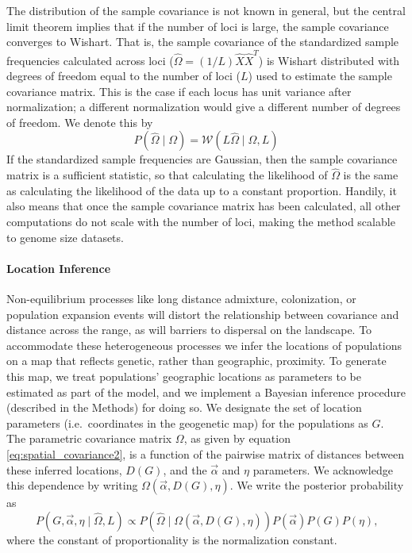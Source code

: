 \documentclass[12pt]{article}
\begin{document}
The distribution of the sample covariance is not known in general,
but the central limit theorem implies that if the number of loci is large, the sample covariance converges to Wishart.
That is, the sample covariance of the standardized sample frequencies calculated across loci 
($ \widehat{\Omega} = (1/L)  \hat{X}\hat{X}^T$) 
is Wishart distributed with degrees of freedom equal to the number of loci ($L$) used to estimate the sample covariance matrix. 
This is the case if each locus has unit variance after normalization; a different normalization would give a different number of degrees of freedom.
We denote this by
\begin{equation}
\label{eq:wishart_dist}
P(\widehat{\Omega} \mid \Omega) = \mathcal{W}\left( L\widehat{\Omega} \mid \Omega,L \right)
\end{equation}
If the standardized sample frequencies are Gaussian, then the sample covariance matrix is a sufficient statistic,
so that calculating the likelihood of $\widehat \Omega$ is the same as calculating the likelihood of the data up to a constant proportion.
Handily, it also means that once the sample covariance matrix has been calculated, all other computations do not scale with the number of loci, making the method scalable to genome size datasets. 

\paragraph{Location Inference} Non-equilibrium processes like long distance admixture, colonization, or population expansion events will distort the relationship between covariance and distance across the range, as will barriers to dispersal on the landscape. To accommodate these heterogeneous processes we infer the locations of populations on a map that reflects genetic, rather than geographic, proximity.  To generate this map, we treat populations' geographic locations as parameters to be estimated as part of the model, and we implement a Bayesian inference procedure (described in the Methods) for doing so.
We designate the set of location parameters (i.e.\ coordinates in the geogenetic map) for the populations as $G$. 
The parametric covariance matrix $\Omega$, as given by equation \eqref{eq:spatial_covariance2}, is a function of the pairwise matrix of distances between these inferred locations, $D(G)$, and the $\vec{\alpha}$ and $\eta$ parameters.  We acknowledge this dependence by writing $\Omega(\vec{\alpha},{D}(G),\eta)$.  We write the posterior probability as 
\begin{equation}
\label{eq:cyol_prob}
P \left( G, \vec{\alpha}, \eta \mid \widehat{\Omega}, L \right) \propto  
	P \left( \widehat{\Omega}  \mid \Omega(\vec{\alpha},{D}(G),\eta ) \right) P(\vec{\alpha}) P(G) P(\eta) \text{,}
\end{equation}
where the constant of proportionality is the normalization constant.  
\end{document}
